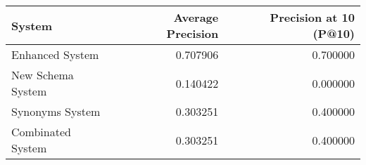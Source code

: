 \begin{tabular}{lrr}
\toprule
System & Average Precision & Precision at 10 (P@10) \\
\midrule
Enhanced System & 0.707906 & 0.700000 \\
New Schema System & 0.140422 & 0.000000 \\
Synonyms System & 0.303251 & 0.400000 \\
Combinated System & 0.303251 & 0.400000 \\
\bottomrule
\end{tabular}
